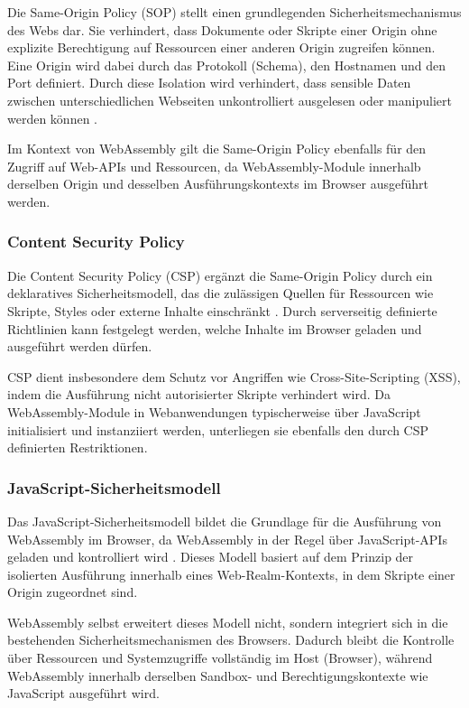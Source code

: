 Die Same-Origin Policy (SOP) stellt einen grundlegenden Sicherheitsmechanismus des Webs dar. Sie verhindert, dass Dokumente oder Skripte einer Origin ohne explizite Berechtigung auf Ressourcen einer anderen Origin zugreifen können. Eine Origin wird dabei durch das Protokoll (Schema), den Hostnamen und den Port definiert. Durch diese Isolation wird verhindert, dass sensible Daten zwischen unterschiedlichen Webseiten unkontrolliert ausgelesen oder manipuliert werden können \cite{rfc6454}.

Im Kontext von WebAssembly gilt die Same-Origin Policy ebenfalls für den Zugriff auf Web-APIs und Ressourcen, da WebAssembly-Module innerhalb derselben Origin und desselben Ausführungskontexts im Browser ausgeführt werden.

\subsubsection{Content Security Policy}

Die Content Security Policy (CSP) ergänzt die Same-Origin Policy durch ein deklaratives Sicherheitsmodell, das die zulässigen Quellen für Ressourcen wie Skripte, Styles oder externe Inhalte einschränkt \cite{csp3}. Durch serverseitig definierte Richtlinien kann festgelegt werden, welche Inhalte im Browser geladen und ausgeführt werden dürfen.

CSP dient insbesondere dem Schutz vor Angriffen wie Cross-Site-Scripting (XSS), indem die Ausführung nicht autorisierter Skripte verhindert wird. Da WebAssembly-Module in Webanwendungen typischerweise über JavaScript initialisiert und instanziiert werden, unterliegen sie ebenfalls den durch CSP definierten Restriktionen.

\subsubsection{JavaScript-Sicherheitsmodell}

Das JavaScript-Sicherheitsmodell bildet die Grundlage für die Ausführung von WebAssembly im Browser, da WebAssembly in der Regel über JavaScript-APIs geladen und kontrolliert wird \cite{ecma262}. Dieses Modell basiert auf dem Prinzip der isolierten Ausführung innerhalb eines Web-Realm-Kontexts, in dem Skripte einer Origin zugeordnet sind.

WebAssembly selbst erweitert dieses Modell nicht, sondern integriert sich in die bestehenden Sicherheitsmechanismen des Browsers. Dadurch bleibt die Kontrolle über Ressourcen und Systemzugriffe vollständig im Host (Browser), während WebAssembly innerhalb derselben Sandbox- und Berechtigungskontexte wie JavaScript ausgeführt wird.

